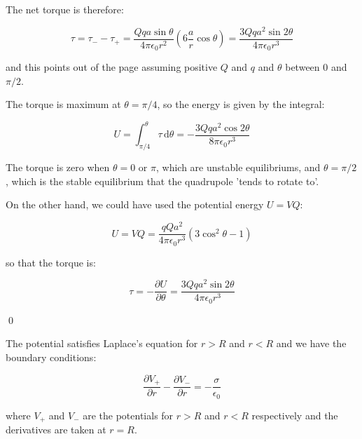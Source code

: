 \documentclass[12pt]{article}
\begin{document}
The net torque is therefore:

\begin{equation}
    \tau = \tau_{-} - \tau_{+} = \frac{Qqa\sin{\theta}}{4\pi\epsilon_{0}r^{2}} \left( 6\frac{a}{r} \cos{\theta} \right) = \frac{3Qqa^{2}\sin{2\theta}}{4\pi\epsilon_{0}r^{3}}
\end{equation}

and this points out of the page assuming positive $Q$ and $q$ and $\theta$ between $0$ and $\pi/2$.

The torque is maximum at $\theta = \pi/4$, so the energy is given by the integral:

\begin{equation}
    U = \int_{\pi/4}^{\theta} \tau \, \mathrm{d}\theta = -\frac{3Qqa^{2}\cos{2\theta}}{8\pi\epsilon_{0}r^{3}}
\end{equation}

The torque is zero when $\theta = 0$ or $\pi$, which are unstable equilibriums, and $\theta = \pi/2$, which is the stable equilibrium that the quadrupole 'tends to rotate to'.

\begin{correction}
    On the other hand, we could have used the potential energy $U = VQ$:

    \begin{equation}
        U = VQ = \frac{qQa^{2}}{4\pi\epsilon_{0}r^{3}} \left( 3 \cos^{2}{\theta} - 1 \right)
    \end{equation}

    so that the torque is:

    \begin{equation}
        \tau = -\frac{\partial U}{\partial \theta} = \frac{3Qqa^{2}\sin{2\theta}}{4\pi\epsilon_{0}r^{3}}
    \end{equation}
\end{correction}
\qed



The potential satisfies Laplace's equation for $r > R$ and $r < R$ and we have the boundary conditions:

\begin{equation}
    \frac{\partial V_{+}}{\partial r} - \frac{\partial V_{-}}{\partial r} = -\frac{\sigma}{\epsilon_{0}}
\end{equation}

where $V_{+}$ and $V_{-}$ are the potentials for $r > R$ and $r < R$ respectively and the derivatives are taken at $r = R$.
\end{document}

